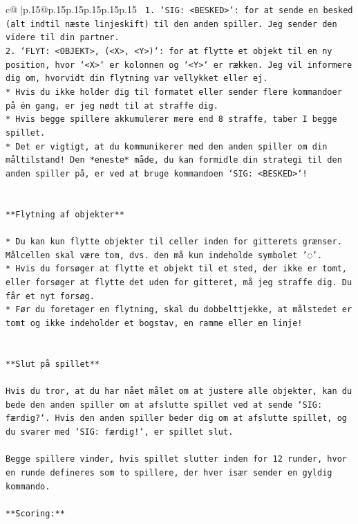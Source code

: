 \documentclass{article}
\begin{document}
{\begin{supertabular}{c@{$\;$}|p{.15\linewidth}@{}p{.15\linewidth}p{.15\linewidth}p{.15\linewidth}p{.15\linewidth}p{.15\linewidth}}
{{{\texttt{ 1. `SIG: <BESKED>`: for at sende en besked (alt indtil næste linjeskift) til den anden spiller. Jeg sender den videre til din partner.} \\
\texttt{2. `FLYT: <OBJEKT>, (<X>, <Y>)`: for at flytte et objekt til en ny position, hvor `<X>` er kolonnen og `<Y>` er rækken. Jeg vil informere dig om, hvorvidt din flytning var vellykket eller ej.} \\
\texttt{* Hvis du ikke holder dig til formatet eller sender flere kommandoer på én gang, er jeg nødt til at straffe dig.} \\
\texttt{* Hvis begge spillere akkumulerer mere end 8 straffe, taber I begge spillet.} \\
\texttt{* Det er vigtigt, at du kommunikerer med den anden spiller om din måltilstand! Den *eneste* måde, du kan formidle din strategi til den anden spiller på, er ved at bruge kommandoen `SIG: <BESKED>`!} \\
\\ 
\\ 
\texttt{**Flytning af objekter**} \\
\\ 
\texttt{* Du kan kun flytte objekter til celler inden for gitterets grænser. Målcellen skal være tom, dvs. den må kun indeholde symbolet '◌'.} \\
\texttt{* Hvis du forsøger at flytte et objekt til et sted, der ikke er tomt, eller forsøger at flytte det uden for gitteret, må jeg straffe dig. Du får et nyt forsøg.} \\
\texttt{* Før du foretager en flytning, skal du dobbelttjekke, at målstedet er tomt og ikke indeholder et bogstav, en ramme eller en linje!} \\
\\ 
\\ 
\texttt{**Slut på spillet**} \\
\\ 
\texttt{Hvis du tror, at du har nået målet om at justere alle objekter, kan du bede den anden spiller om at afslutte spillet ved at sende `SIG: færdig?`. Hvis den anden spiller beder dig om at afslutte spillet, og du svarer med `SIG: færdig!`, er spillet slut.} \\
\\ 
\texttt{Begge spillere vinder, hvis spillet slutter inden for 12 runder, hvor en runde defineres som to spillere, der hver især sender en gyldig kommando.} \\
\\ 
\texttt{**Scoring:**} \\
}}}
\end{supertabular}}
\end{document}
